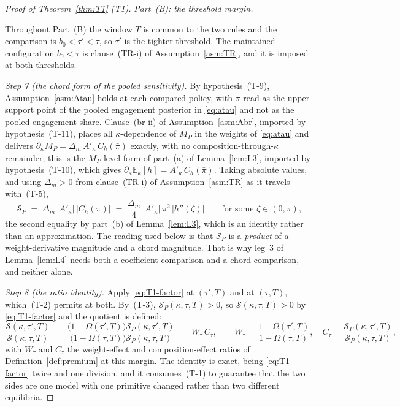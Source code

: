 \documentclass[11pt]{article}
\newcommand{\Eop}{\mathbb{E}}
\newcommand{\Akap}{A'_{\kappa}}
\begin{document}
\begin{proof}[Proof of Theorem~\ref{thm:T1} (T1)]
\medskip
\noindent\emph{Part~(B): the threshold margin.}

Throughout Part~(B) the window $T$ is common to the two rules and the comparison is
$b_0 < \tau' < \tau$, so $\tau'$ is the tighter threshold. The maintained configuration
$b_0 < \tau$ is clause~(TR-i) of Assumption~\ref{asm:TR}, and it is imposed at both thresholds.

\emph{Step 7 (the chord form of the pooled sensitivity).} By hypothesis~(T-9),
Assumption~\ref{asm:Atau} holds at each compared policy, with $\bar\pi$ read as the upper support
point of the pooled engagement posterior in \eqref{eq:atau} and not as the pooled engagement share.
Clause~(br-ii) of Assumption~\ref{asm:Abr}, imported by hypothesis~(T-11), places all
$\kappa$-dependence of $M_P$ in the weights of \eqref{eq:atau} and delivers
$\partial_\kappa M_P = \Delta_m\,\Akap\,C_h(\bar\pi)$ exactly, with no
composition-through-$\kappa$ remainder; this is the $M_P$-level form of part~(a) of
Lemma~\ref{lem:L3}, imported by hypothesis~(T-10), which gives
$\partial_\kappa\Eop_\kappa[h] = \Akap\,C_h(\bar\pi)$. Taking absolute values, and using
$\Delta_m > 0$ from clause~(TR-i) of Assumption~\ref{asm:TR} as it travels with~(T-5),
\begin{equation}
\label{eq:T1-chord}
\mathcal S_P \;=\; \Delta_m\,\lvert\Akap\rvert\,\lvert C_h(\bar\pi)\rvert
\;=\; \frac{\Delta_m}{4}\,\lvert\Akap\rvert\,\bar\pi^2\,\lvert h''(\zeta)\rvert
\qquad\text{for some }\zeta\in(0,\bar\pi),
\end{equation}
the second equality by part~(b) of Lemma~\ref{lem:L3}, which is an identity rather than an
approximation. The reading used below is that $\mathcal S_P$ is a \emph{product} of a
weight-derivative magnitude and a chord magnitude. That is why leg~3 of Lemma~\ref{lem:L4} needs
both a coefficient comparison and a chord comparison, and neither alone.

\emph{Step 8 (the ratio identity).} Apply \eqref{eq:T1-factor} at $(\tau',T)$ and at $(\tau,T)$,
which~(T-2) permits at both. By~(T-3), $\mathcal S_P(\kappa,\tau,T) > 0$, so
$\mathcal S(\kappa,\tau,T) > 0$ by \eqref{eq:T1-factor} and the quotient is defined:
\begin{equation}
\label{eq:T1-ratio-tau}
\frac{\mathcal S(\kappa,\tau',T)}{\mathcal S(\kappa,\tau,T)}
\;=\; \frac{\bigl(1-\Omega(\tau',T)\bigr)\mathcal S_P(\kappa,\tau',T)}
            {\bigl(1-\Omega(\tau,T)\bigr)\mathcal S_P(\kappa,\tau,T)}
\;=\; W_\tau\,C_\tau,
\qquad
W_\tau = \frac{1-\Omega(\tau',T)}{1-\Omega(\tau,T)},\quad
C_\tau = \frac{\mathcal S_P(\kappa,\tau',T)}{\mathcal S_P(\kappa,\tau,T)},
\end{equation}
with $W_\tau$ and $C_\tau$ the weight-effect and composition-effect ratios of
Definition~\ref{def:premium} at this margin. The identity is exact, being
\eqref{eq:T1-factor} twice and one division, and it consumes~(T-1) to guarantee that the two
sides are one model with one primitive changed rather than two different equilibria.


\end{proof}
\end{document}
